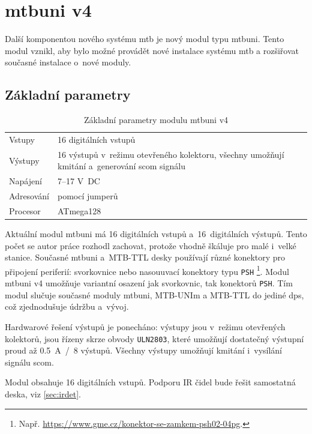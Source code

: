 \newpage
\section{\gls{mtbuni} v4}

Další komponentou nového systému \gls{mtb} je nový modul typu \gls{mtbuni}.
Tento modul vznikl, aby bylo možné provádět nové instalace systému \gls{mtb}
a rozšiřovat současné instalace o~nové moduly.

\subsection{Základní parametry}

\begin{table}[h]
	\begin{tabularx}{\textwidth}{lX}
		\toprule
		Vstupy & 16 digitálních vstupů \\
		Výstupy & 16 výstupů v~režimu otevřeného kolektoru, všechny umožňují
		kmitání a~generování \gls{scom} signálu \\
		Napájení & 7–17 V~DC \\
		Adresování & pomocí jumperů \\
		Procesor & ATmega128 \\
		\bottomrule
	\end{tabularx}
	\caption{Základní parametry modulu \gls{mtbuni} v4}
	\label{tab:mtbuni-params}
\end{table}

Aktuální modul \gls{mtbuni} má 16 digitálních vstupů a~16~digitálních výstupů.
Tento počet se autor práce rozhodl zachovat, protože vhodně škáluje pro malé
i~velké stanice. Současné \gls{mtbuni} a~MTB-TTL desky používají různé konektory
pro připojení periferií: svorkovnice nebo nasouuvací konektory typu \texttt{PSH}
\footnote{Např. \url{https://www.gme.cz/konektor-se-zamkem-psh02-04pg}.}.
Modul \gls{mtbuni} v4 umožňuje variantní osazení jak svorkovnic, tak konektorů
\texttt{PSH}. Tím modul slučuje současné moduly \gls{mtbuni}, MTB-UNIm a
MTB-TTL do jediné \gls{dps}, což zjednodušuje údržbu a~vývoj.

Hardwarové řešení výstupů je ponecháno: výstupy jsou v~režimu otevřených
kolektorů, jsou řízeny skrze obvody \texttt{ULN2803}, které umožňují
dostatečný výstupní proud až 0.5~A~/~8 výstupů. Všechny výstupy umožňují kmitání
i~vysílání signálu \gls{scom}.

Modul obsahuje 16 digitálních vstupů. Podporu IR čidel bude řešit samostatná
deska, viz \ref{sec:irdet}.


